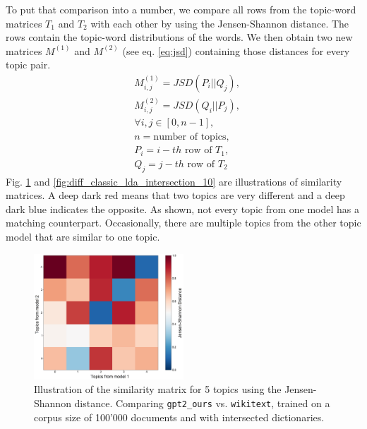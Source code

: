 To put that comparison into a number, we compare all rows from the topic-word matrices $T_1$ and $T_2$ with each other by using the Jensen-Shannon distance. The rows contain the topic-word distributions of the words. We then obtain two new matrices $M^{(1)}$ and $M^{(2)}$ (see eq. \ref{eq:jsd}) containing those distances for every topic pair.
\begin{equation}\label{eq:jsd}
    \begin{split}
        & M^{(1)}_{i,j}=JSD(P_i||Q_j), \\
        & M^{(2)}_{i,j}=JSD(Q_i||P_j),\\
        & \forall i,j\in[0,n-1],\\
        & n = \text{number of topics,}\\
        & P_i=i-th \text{ row of }T_1,\\
        & Q_j=j-th \text{ row of }T_2
    \end{split}
\end{equation}
Fig. \ref{fig:diff_classic_lda_intersection_5} and \ref{fig:diff_classic_lda_intersection_10} are illustrations of similarity matrices. A deep dark red means that two topics are very different and a deep dark blue indicates the opposite. As shown, not every topic from one model has a matching counterpart. Occasionally, there are multiple topics from the other topic model that are similar to one topic. 
\begin{figure}[H]
    \centering
    \includegraphics[width=0.5\textwidth]{figures/diff_classic_lda_intersection_5}
    \caption{Illustration of the similarity matrix for 5 topics using the Jensen-Shannon distance. Comparing \texttt{gpt2\_ours} vs. \texttt{wikitext}, trained on a corpus size of 100'000 documents and with intersected dictionaries.}
    \label{fig:diff_classic_lda_intersection_5}
\end{figure}
